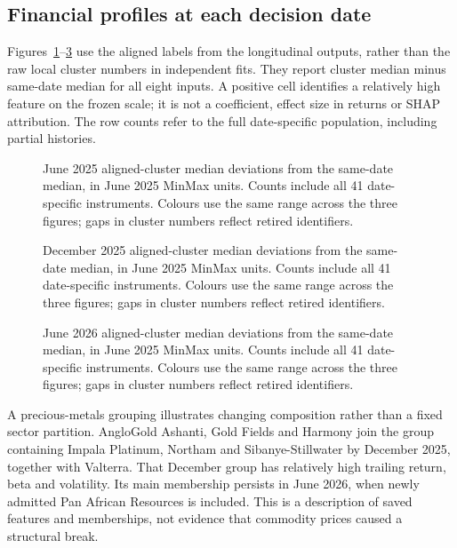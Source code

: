 \subsection{Financial profiles at each decision date}

Figures~\ref{fig:profile0}--\ref{fig:profile2} use the aligned labels from the longitudinal outputs, rather than the raw local cluster numbers in independent fits. They report cluster median minus same-date median for all eight inputs. A positive cell identifies a relatively high feature on the frozen scale; it is not a coefficient, effect size in returns or SHAP attribution. The row counts refer to the full date-specific population, including partial histories.



\begin{figure}[htbp]
\centering
{}
\caption{June 2025 aligned-cluster median deviations from the same-date median, in June 2025 MinMax units. Counts include all 41 date-specific instruments. Colours use the same range across the three figures; gaps in cluster numbers reflect retired identifiers.}\label{fig:profile0}
\end{figure}



\begin{figure}[htbp]
\centering
{}
\caption{December 2025 aligned-cluster median deviations from the same-date median, in June 2025 MinMax units. Counts include all 41 date-specific instruments. Colours use the same range across the three figures; gaps in cluster numbers reflect retired identifiers.}\label{fig:profile1}
\end{figure}



\begin{figure}[htbp]
\centering
{}
\caption{June 2026 aligned-cluster median deviations from the same-date median, in June 2025 MinMax units. Counts include all 41 date-specific instruments. Colours use the same range across the three figures; gaps in cluster numbers reflect retired identifiers.}\label{fig:profile2}
\end{figure}


A precious-metals grouping illustrates changing composition rather than a fixed sector partition. AngloGold Ashanti, Gold Fields and Harmony join the group containing Impala Platinum, Northam and Sibanye-Stillwater by December 2025, together with Valterra. That December group has relatively high trailing return, beta and volatility. Its main membership persists in June 2026, when newly admitted Pan African Resources is included. This is a description of saved features and memberships, not evidence that commodity prices caused a structural break.


